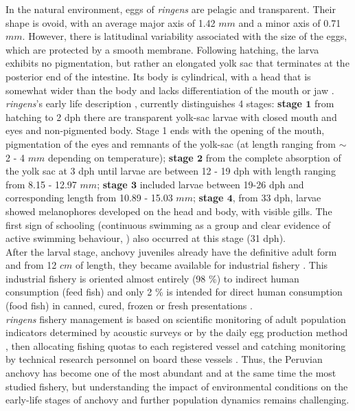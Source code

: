 In the natural environment, eggs of \textit{\gls{ringens}} are pelagic and transparent. Their shape is ovoid, with an average major axis of 1.42 $mm$ and a minor axis of 0.71 $mm$. However, there is latitudinal variability associated with the size of the eggs, which are protected by a smooth membrane. Following hatching, the larva exhibits no pigmentation, but rather an elongated yolk sac that terminates at the posterior end of the intestine. Its body is cylindrical, with a head that is somewhat wider than the body and lacks differentiation of the mouth or jaw \citep{EinaRoja1963}. \textit{\gls{ringens}}’s early life description \citep{RiouOfel2021}, currently distinguishes 4 stages: \textbf{stage $\mathbf{1}$} from hatching to 2 \acrfull{dph} there are transparent yolk-sac larvae with closed mouth and eyes and non-pigmented body. Stage 1 ends with the opening of the mouth, pigmentation of the eyes and remnants of the yolk-sac (at length ranging from $\sim$ 2 - 4 $mm$ depending on temperature); \textbf{stage $\mathbf{2}$} from the complete absorption of the yolk sac at 3 \acrshort{dph} until larvae are between 12 - 19 \acrshort{dph} with length ranging from 8.15 - 12.97 $mm$; \textbf{stage $\mathbf{3}$} included larvae between 19-26 \acrshort{dph} and corresponding length from 10.89 - 15.03 $mm$; \textbf{stage $\mathbf{4}$}, from 33 \acrshort{dph}, larvae showed melanophores developed on the head and body, with visible gills. The first sign of schooling (continuous swimming as a group and clear evidence of active swimming behaviour, \cite{Shaw1962}) also occurred at this stage (31 \acrshort{dph}).\\

After the larval stage, anchovy juveniles already have the definitive adult form and from 12 $cm$ of length, they became available for industrial fishery \citep{MarzShin2009}. This industrial fishery is oriented almost entirely (98 \%) to indirect human consumption (feed fish) and only 2 \% is intended for direct human consumption (food fish) in canned, cured, frozen or fresh presentations \citep{FreoSuei2014}.\\

\textit{\gls{ringens}} fishery management is based on scientific monitoring of adult population indicators determined by acoustic surveys \citep{GutiSwar2007} or by the daily egg production method \citep{Ayon2000}, then allocating fishing quotas to each registered vessel and catching monitoring by technical research personnel on board these vessels \citep{KroeSanc2019}. Thus, the Peruvian anchovy has become one of the most abundant and at the same time the most studied fishery, but understanding the impact of environmental conditions on the early-life stages of anchovy and further population dynamics remains challenging.\\

